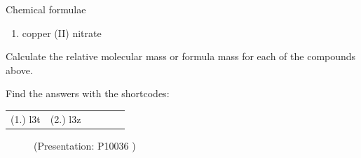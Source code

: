 \begin{exercises}{Chemical formulae
        }
\begin{enumerate}[noitemsep, label=\textbf{\arabic*}. ]
\begin{enumerate}[noitemsep, label=\textbf{\alph*}. ]
\item copper (II) nitrate
\end{enumerate}
Calculate the relative molecular mass or formula mass for each of the compounds above.
                \end{enumerate}
\label{m38689*cid121}
\par {} Find the answers with the shortcodes:
 \par \begin{tabular}[h]{cccccc}
 (1.) l3t  &  (2.) l3z  & \end{tabular}
\end{exercises}
    \label{m38689*eip-891}
    \setcounter{subfigure}{0}
	\begin{figure}[H] %
    \label{m38689*slidesharemedia}\label{m38689*slideshareflash} { (Presentation:  P10036 )}
      \vspace{2pt}
    \vspace{.1in}
 \end{figure}       \par \label{m38689*cid13}
